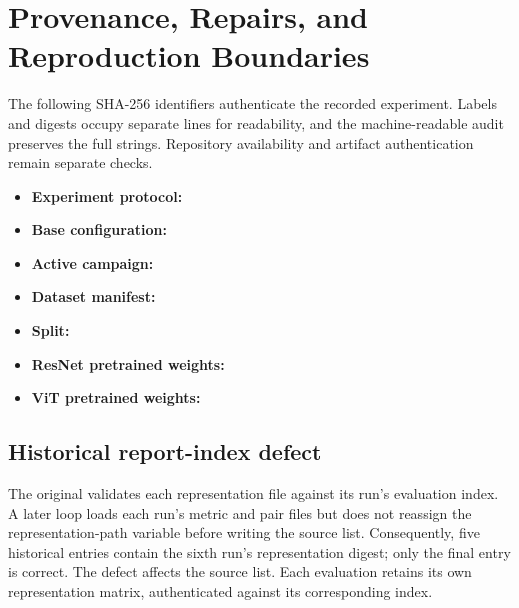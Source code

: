 \section{Provenance, Repairs, and Reproduction Boundaries}\label{app:provenance}
The following SHA-256 identifiers authenticate the recorded experiment. Labels and digests occupy separate lines for readability, and the machine-readable audit preserves the full strings. Repository availability and artifact authentication remain separate checks.
\begin{itemize}
\setlength{\itemsep}{1pt}
\item \textbf{Experiment protocol:}\\[-2pt] 
\item \textbf{Base configuration:}\\[-2pt] 
\item \textbf{Active campaign:}\\[-2pt] 
\item \textbf{Dataset manifest:}\\[-2pt] 
\item \textbf{Split:}\\[-2pt] 
\item \textbf{ResNet pretrained weights:}\\[-2pt] 
\item \textbf{ViT pretrained weights:}\\[-2pt] 
\end{itemize}
\subsection{Historical report-index defect}
The original  validates each representation file against its run's evaluation index. A later loop loads each run's metric and pair files but does not reassign the representation-path variable before writing the source list. Consequently, five historical entries contain the sixth run's representation digest; only the final entry is correct. The defect affects the source list. Each evaluation retains its own representation matrix, authenticated against its corresponding index.

